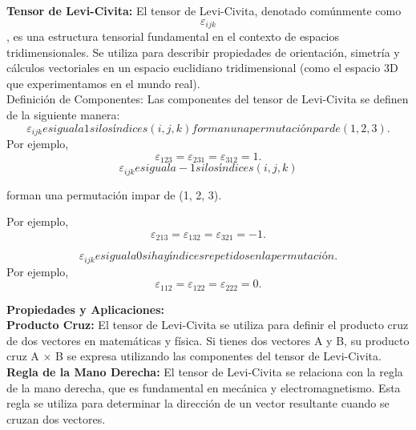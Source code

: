 \textbf{Tensor de Levi-Civita:} El tensor de Levi-Civita, denotado comúnmente como $$ \varepsilon_{ijk} $$, es una estructura tensorial fundamental en el contexto de espacios tridimensionales. Se utiliza para describir propiedades de orientación, simetría y cálculos vectoriales en un espacio euclidiano tridimensional (como el espacio 3D que experimentamos en el mundo real). \\

Definición de Componentes: Las componentes del tensor de Levi-Civita se definen de la siguiente manera: \\

\begin{equation}
\varepsilon_{ijk} es igual a 1 si los índices (i, j, k) forman una permutación par de (1, 2, 3).
\end{equation}
Por ejemplo, 
\begin{equation}
\varepsilon_{123} = \varepsilon_{231} = \varepsilon_{312} = 1.
\end{equation}
\begin{equation}
\varepsilon_{ijk} es igual a -1 si los índices (i, j, k) 
\end{equation}

forman una permutación impar de (1, 2, 3). 

Por ejemplo, 
\begin{equation}
\varepsilon_{213} = \varepsilon_{132} = \varepsilon_{321} = -1.
\end{equation}

\begin{equation}
\varepsilon_{ijk} es igual a 0 si hay índices repetidos en la permutación. 
\end{equation}
Por ejemplo, 
\begin{equation}
\varepsilon_{112} = \varepsilon_{122} = \varepsilon_{222} = 0.
\end{equation}

\textbf{Propiedades y Aplicaciones:} \\

\textbf{Producto Cruz:} El tensor de Levi-Civita se utiliza para definir el producto cruz de dos vectores en matemáticas y física. Si tienes dos vectores A y B, su producto cruz A × B se expresa utilizando las componentes del tensor de Levi-Civita.\\

\textbf{Regla de la Mano Derecha:} El tensor de Levi-Civita se relaciona con la regla de la mano derecha, que es fundamental en mecánica y electromagnetismo. Esta regla se utiliza para determinar la dirección de un vector resultante cuando se cruzan dos vectores.


